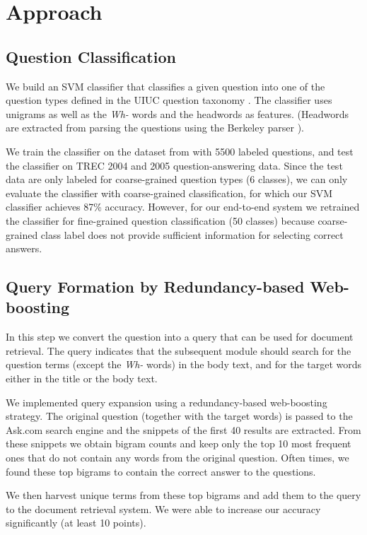 \documentclass[11pt]{article}
\begin{document}
\section{Approach}
\subsection{Question Classification}
We build an SVM classifier that classifies a given question into one of the question types defined in the UIUC question taxonomy \cite{uiuc}. The classifier uses unigrams as well as the {\it Wh-} words and the headwords as features. (Headwords are extracted from parsing the questions using the Berkeley parser \cite{berkeleyparser}).

We train the classifier on the dataset from \cite{uiuc} with 5500 labeled questions, and test the classifier on TREC 2004 and 2005 question-answering data. Since the test data are only labeled for coarse-grained question types (6 classes), we can only evaluate the classifier with coarse-grained classification, for which our SVM classifier achieves 87\% accuracy. However, for our end-to-end system we retrained the classifier for fine-grained question classification (50 classes) because coarse-grained class label does not provide sufficient information for selecting correct answers.

\subsection{Query Formation by Redundancy-based Web-boosting}
In this step we convert the question into a query that can be used for document retrieval. The query indicates that the subsequent module should search for the question terms (except the {\it Wh-} words) in the body text, and for the target words either in the title or the body text.

We implemented query expansion using a redundancy-based web-boosting strategy. The original question (together with the target words) is passed to the Ask.com search engine and the snippets of the first 40 results are extracted. From these snippets we obtain bigram counts and keep only the top 10 most frequent ones that do not contain any words from the original question. Often times, we found these top bigrams to  contain the correct answer to the questions.

We then harvest unique terms from these top bigrams and add them to the query to the document retrieval system. We were able to increase our accuracy significantly (at least 10 points).
\end{document}
